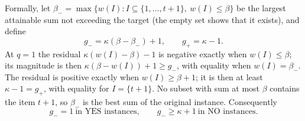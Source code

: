 Formally, let $\beta_-=\max\{w(I):I\subseteq\{1,\ldots,t+1\},\
w(I)\le\beta\}$ be the largest attainable sum not exceeding the target
(the empty set shows that it exists), and define
\begin{equation}\label{eq:nearestsums}
 g_-=\kappa(\beta-\beta_-)+1,\qquad g_+=\kappa-1.
\end{equation}
At $q=1$ the residual $\kappa(w(I)-\beta)-1$ is negative exactly when
$w(I)\le\beta$; its magnitude is then $\kappa(\beta-w(I))+1\ge g_-$, with
equality when $w(I)=\beta_-$. The residual is positive exactly when
$w(I)\ge\beta+1$; it is then at least $\kappa-1=g_+$, with equality for
$I=\{t+1\}$. No subset with sum at most $\beta$ contains the item $t+1$, so
$\beta_-$ is the best sum of the original instance. Consequently
\begin{equation}\label{eq:gapcases}
 g_-=1\ \text{in YES instances},\qquad g_-\ge\kappa+1\ \text{in NO instances}.
\end{equation}

